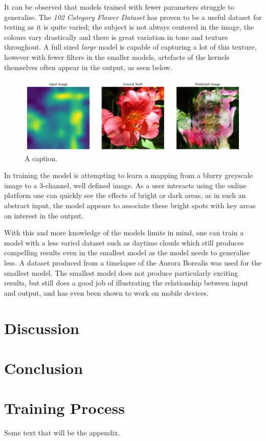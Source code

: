 \documentclass{article}
\begin{document}
It can be observed that models trained with fewer parameters struggle to generalise. The \textit{102 Category Flower Dataset}\cite{flowers_dataset} has proven to be a useful dataset for testing as it is quite varied; the subject is not always centered in the image, the colours vary drastically and there is great variation in tone and texture throughout. A full sized \textit{large} model is capable of capturing a lot of this texture, however with fewer filters in the smaller models, artefacts of the kernels themselves often appear in the output, as seen below.

\begin{figure}
	\centering
	\includegraphics[scale=0.4]{artefacts}
	\caption{A caption.}
\end{figure}

In training the model is attempting to learn a mapping from a blurry greyscale image to a 3-channel, well defined image. As a user interacts using the online platform one can quickly see the effects of bright or dark areas, as in such an abstract input, the model appears to associate these bright spots with key areas on interest in the output.

With this and more knowledge of the models limits in mind, one can train a model with a less varied dataset such as daytime clouds which still produces compelling results even in the smallest model as the model needs to generalise less. A dataset produced from a timelapse of the Aurora Borealis was used for the smallest model. The smallest model does not produce particularly exciting results, but still does a good job of illustrating the relationship between input and output, and has even been shown to work on mobile devices.

\section{Discussion}


\section{Conclusion}



\medskip
\printbibliography

\appendix
\section{Training Process}
Some text that will be the appendix.
\end{document}
